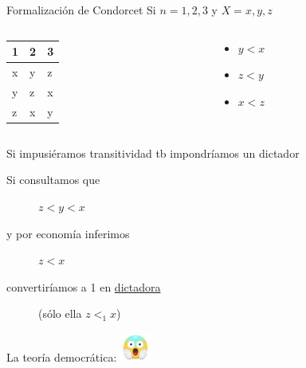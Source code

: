 \documentclass[bigger]{beamer}
\begin{document}
\begin{frame}[label={sec:org9099d41}]{Formalización de Condorcet}
Si \(n=1,2,3\) y \(X=x,y,z\)

\begin{columns}
\begin{column}{0.4\columnwidth}
\centering
\begin{center}
\begin{tabular}{lll}
1 & 2 & 3\\[0pt]
\hline
x & y & z\\[0pt]
y & z & x\\[0pt]
z & x & y\\[0pt]
\end{tabular}
\end{center}
\end{column}
\begin{column}{0.6\columnwidth}
\begin{itemize}
\item \(y < x\)
\item \(z < y\)
\item \(x < z\)
\end{itemize}

\bigskip \pause
\end{column}
\end{columns}
\begin{block}{Si impusiéramos transitividad tb impondríamos un dictador}
\begin{description}
\item[{Si consultamos que}] \(z < y < x\)
\end{description}

\begin{description}
\item[{y por economía inferimos}] \(z < x\)
\item[{convertiríamos a 1 en \uline{dictadora}}] (sólo ella \(z <_1 x\))
\end{description}
\bigskip \pause
\end{block}
La teoría democrática: \includegraphics[width=1cm]{./pics/emoji-panic.png} 
\end{frame}
\end{document}
